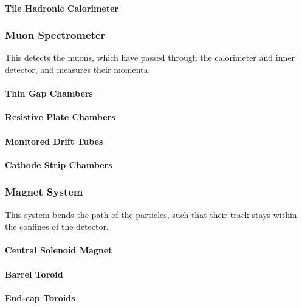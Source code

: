 \documentclass[11pt,a4paper]{article}
\begin{document}
\paragraph{Tile Hadronic Calorimeter}

\subsubsection{Muon Spectrometer}
This detects the muons, which have passed through the calorimeter and inner
detector, and measures their momenta.

\paragraph{Thin Gap Chambers}
\paragraph{Resistive Plate Chambers}
\paragraph{Monitored Drift Tubes}
\paragraph{Cathode Strip Chambers}

\subsubsection{Magnet System}
This system bends the path of the particles, such that their track stays within
the confines of the detector.

\paragraph{Central Solenoid Magnet}
\paragraph{Barrel Toroid}
\paragraph{End-cap Toroids}
\end{document}
